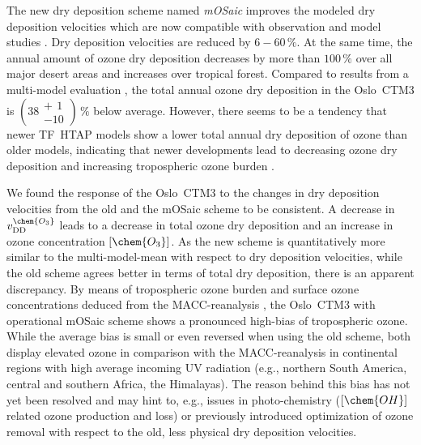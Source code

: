 \documentclass[gmd, manuscript]{copernicus}
\begin{document}
The new dry deposition scheme named \emph{mOSaic} improves the modeled dry deposition velocities which are now compatible with observation and model studies \citep[e.g.,][]{ACP:Hardacre2015,ACP:Luhar2018}. Dry deposition velocities are reduced by $6-60\,\unit{\%}$. At the same time, the annual amount of ozone dry deposition decreases by more than $100\,\unit{\%}$ over all major desert areas and increases over tropical forest. Compared to results from a multi-model evaluation \citep{ACP:Hardacre2015}, the total annual ozone dry deposition in the Oslo~CTM3 is $(38\substack{+~\,1 \\ -10})\,\unit{\%}$ below average. However, there seems to be a tendency that newer TF~HTAP models show a lower total annual dry deposition of ozone than older models, indicating that newer developments lead to decreasing ozone dry deposition and increasing tropospheric ozone burden \citep[e.g.,][]{ACP:Luhar2017,ACP:Luhar2018,AE:Hu2017}.

We found the response of the Oslo~CTM3 to the changes in dry deposition velocities from the old and the mOSaic scheme to be consistent. A decrease in $v_\text{DD}^\chem{O_3}$ leads to a decrease in total ozone dry deposition and an increase in ozone concentration $[\chem{O_3}]$. As the new scheme is quantitatively more similar to the multi-model-mean \citep{ACP:Hardacre2015} with respect to dry deposition velocities, while the old scheme agrees better in terms of total dry deposition, there is an apparent discrepancy. By means of tropospheric ozone burden \citep{ESA:Gaudel2018} and surface ozone concentrations deduced from the MACC-reanalysis \citep{MACC-II}, the Oslo~CTM3 with operational mOSaic scheme shows a pronounced high-bias of tropospheric ozone. While the average bias is small or even reversed when using the old scheme, both display elevated ozone in comparison with the MACC-reanalysis in continental regions with high average incoming UV radiation (e.g., northern South America, central and southern Africa, the Himalayas).
The reason behind this bias has not yet been resolved and may hint to, e.g., issues in photo-chemistry ($[\chem{OH}]$ related ozone production and loss) or previously introduced optimization of ozone removal with respect to the old, less physical dry deposition velocities.
\end{document}
